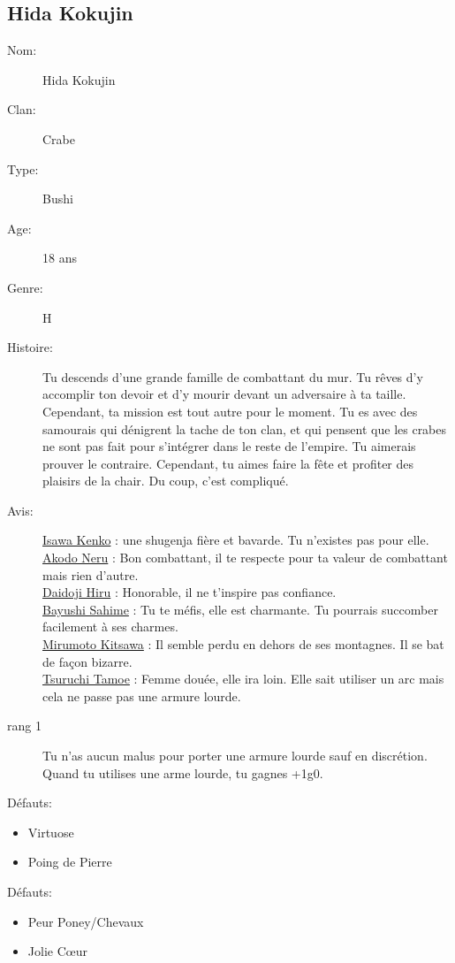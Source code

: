 \documentclass[oneside,12pt]{book}
\begin{document}
\begin{flushleft}
\clearpage

\section{Hida Kokujin}
\begin{description}
\item[Nom:]{Hida Kokujin}
\item[Clan:]{Crabe}
\item[Type:]{Bushi}
\item[Age:]{18 ans}
\item[Genre:]{H}
\item[Histoire:]{
Tu descends d'une grande famille de combattant du mur. Tu rêves d'y accomplir ton devoir et d'y mourir devant un adversaire à ta taille. Cependant, ta mission est tout autre pour le moment. Tu es avec des samourais qui dénigrent la tache de ton clan, et qui pensent que les crabes ne sont pas fait pour s'intégrer dans le reste de l'empire. Tu aimerais prouver le contraire. Cependant, tu aimes faire la fête et profiter des plaisirs de la chair. Du coup, c'est compliqué.
\vspace{0.2cm}
}
\item[Avis:]{
\underline{Isawa Kenko} : une shugenja fière et bavarde. Tu n'existes pas pour elle.\\
\underline{Akodo Neru} : Bon combattant, il te respecte pour ta valeur de combattant mais rien d'autre.\\
\underline{Daidoji Hiru} : Honorable, il ne t'inspire pas confiance.\\
\underline{Bayushi Sahime} : Tu te méfis, elle est charmante. Tu pourrais succomber facilement à ses charmes.\\
\underline{Mirumoto Kitsawa} : Il semble perdu en dehors de ses montagnes. Il se bat de façon bizarre. \\
\underline{Tsuruchi Tamoe} : Femme douée, elle ira loin. Elle sait utiliser un arc mais cela ne passe pas une armure lourde. \\
}
\item[rang 1]{
Tu n'as aucun malus pour porter une armure lourde sauf en discrétion. Quand tu utilises une arme lourde, tu gagnes +1g0. 
}
\end{description}
\vspace{0.2cm}
Défauts:
\begin{itemize}
\item Virtuose
\item Poing de Pierre
\end{itemize}
Défauts:
\begin{itemize}
\item Peur Poney/Chevaux
\item Jolie Cœur
\end{itemize}



\end{flushleft}
\end{document}

